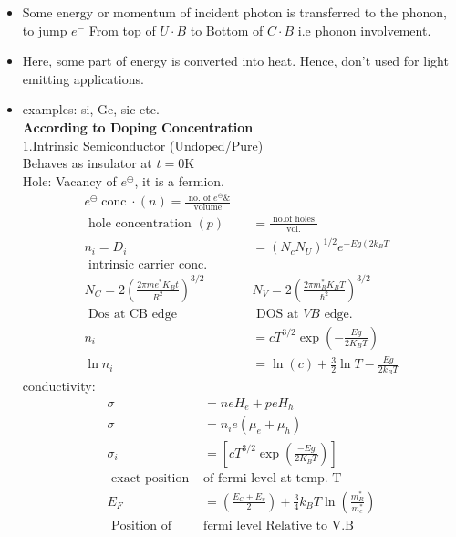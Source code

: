 \begin{itemize}
	\item Some energy or momentum of incident photon is transferred to the phonon, to jump $e^-$ From top of $U \cdot B$ to Bottom of $C \cdot B$ i.e phonon involvement.
	\item Here, some part of energy is converted into heat. Hence, don't used for light emitting applications.
	\item examples: si, Ge, sic etc.\\
	\textbf{According to Doping Concentration}\\
	1.Intrinsic Semiconductor (Undoped/Pure)\\
	Behaves as insulator at $t=$0K\\
	Hole: Vacancy of $e^{\ominus}$, it is a fermion.
	\begin{align*}
	e^{\ominus} \operatorname{conc} \cdot(n)=\frac{\text { no. of } e^{\ominus }\&}{\text { volume }}\\
	\text { hole concentration }(p)&=\frac{\text { no.of holes }}{\text { vol. }}\\
	n_{i}=D_{i}&=\left(N_{c} N_{U}\right)^{1 / 2} e^{-E g\left(2 k_{B} T\right.}\\
	\text { intrinsic carrier conc. }&\\
	N_{C}=2\left(\frac{2 \pi m e^{*} K_{B} t}{R^{2}}\right)^{3 / 2}\qquad& N_{V}=2\left(\frac{2 \pi m_{R}^{*} K_{B} T}{\hbar^{2}}\right)^{3 / 2}\\
	\text { Dos at CB edge }\hspace{2cm}&\text { DOS at } V B \text { edge. }\\
	n_{i}&=c T^{3 / 2} \exp \left(-\frac{E g}{2 K_{B} T}\right)\\
	\ln n_{i}&=\ln (c)+\frac{3}{2} \ln T-\frac{E g}{2 k_{B} T}
	\end{align*}
	conductivity:
		\begin{align*}
		\sigma&=n e H_{e}+p e H_{h}\\
		\sigma&=n_{i} e\left(\mu_{e}+\mu_{h}\right)\\
		\sigma_{i}&=\left[c T^{3 / 2} \exp \left(\frac{-E g}{2 K_{B} T}\right)\right]\\
		\text { exact position  }&\text{of fermi level at temp. T}\\
		E_{F}&=\left(\frac{E_{C}+E_{v}}{2}\right)+\frac{3}{4} k_{B} T \ln \left(\frac{m_{R}^{*}}{m_{e}^{*}}\right)\\
		\text { Position of  }&\text{fermi level Relative to V.B}\\

\end{align*}
\end{itemize}
